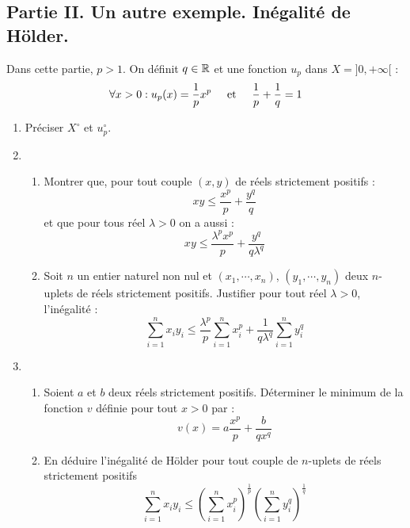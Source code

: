 \subsection*{Partie II. Un autre exemple. Inégalité de Hölder.}
Dans cette partie, $p > 1$. On définit $q\in \mathbb{R}$ et une fonction $u_p$ dans $X=]0,+\infty[$ :
\begin{displaymath}
 \forall x>0: u_p(x) = \frac{1}{p}x^p\hspace{0.5cm}\text{et}\hspace{0.5cm} \frac{1}{p}+\frac{1}{q}=1
\end{displaymath}
\begin{enumerate}
\item Préciser $X^\circ$ et $u_p^\circ$.
\item \begin{enumerate}
\item Montrer que, pour tout couple $(x,y)$ de réels strictement positifs :
\[xy\leq \frac{x^p}{p} + \frac{y^q}{q}\]
et que pour tous réel $\lambda >0$ on a aussi :
\[xy\leq \frac{\lambda ^p x^p}{p} + \frac{y^q}{q \lambda ^q }\]
\item Soit $n$ un entier naturel non nul et $(x_1,\cdots,x_n)$, $(y_1,\cdots,y_n)$ deux $n$-uplets de réels strictement positifs. Justifier pour tout réel $\lambda>0$, l'inégalité :
\[\sum_{i=1}^{n}x_i y_i \leq \frac{\lambda ^p}{p}\sum_{i=1}^{n}x_{i}^{p} + \frac{1}{q\lambda ^q}\sum_{i=1}^{n}y_{i}^{q}\]
      \end{enumerate}
\item \begin{enumerate}
\item Soient $a$ et $b$ deux réels strictement positifs. Déterminer le minimum de la fonction $v$ définie pour tout $x>0$ par :
\[v(x)=a\frac{x^p}{p}+\frac{b}{qx^q}\]
\item En déduire l'inégalité de Hölder pour tout couple de $n$-uplets de réels strictement positifs
\[\sum_{i=1}^{n}x_i y_i \leq \left( \sum_{i=1}^{n}x_{i}^{p}\right) ^{\frac{1}{p}} \left( \sum_{i=1}^{n}y_{i}^{q}\right) ^{\frac{1}{q}}\]
\end{enumerate}
\end{enumerate}

